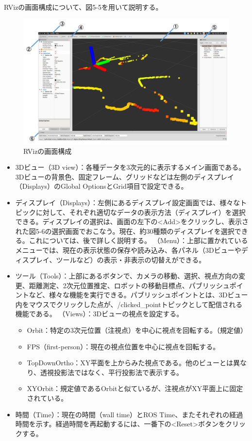 RVizの画面構成について、図5-5を用いて説明する。

\begin{figure}[h]
  \centering
  \includegraphics[width=\columnwidth]{pictures/chapter5/pic_05_05.png}
  \caption{RVizの画面構成}
\end{figure}

\begin{itemize}
\item 3Dビュー（3D view）：各種データを3次元的に表示するメイン画面である。3Dビューの背景色、固定フレーム、グリッドなどは左側のディスプレイ（Displays）のGlobal OptionsとGrid項目で設定できる。
\item ディスプレイ（Displays）：左側にあるディスプレイ設定画面では、様々なトピックに対して、それぞれ適切なデータの表示方法（ディスプレイ）を選択できる。ディスプレイの選択は、画面の左下の<Add>をクリックし、表示された図5-6の選択画面でおこなう。現在、約30種類のディスプレイを選択できる。これについては、後で詳しく説明する。
（Menu）：上部に置かれているメニューでは、現在の表示状態の保存や読み込み、各パネル（3Dビューやディスプレイ、ツールなど）の表示・非表示の切替えができる。
\item ツール（Tools）：上部にあるボタンで、カメラの移動、選択、視点方向の変更、距離測定、2次元位置推定、ロボットの移動目標点、パブリッシュポイントなど、様々な機能を実行できる。パブリッシュポイントとは、3Dビュー内をマウスでクリックした点が、/clicked\_pointトピックとして配信される機能である。
（Views）：3Dビューの視点を設定する。
  \begin{itemize}
  \item Orbit：特定の3次元位置（注視点）を中心に視点を回転する。（規定値）
  \item FPS（first-person）：現在の視点位置を中心に視点を回転する。
  \item TopDownOrtho：XY平面を上からみた視点である。他のビューとは異なり、透視投影法ではなく、平行投影法で表示する。
  \item  XYOrbit：規定値であるOrbitと似ているが、注視点がXY平面上に固定されている。
  \end{itemize}
\item 時間（Time）：現在の時間（wall time）とROS Time、またそれぞれの経過時間を示す。経過時間を再起動するには、一番下の<Reset>ボタンをクリックする。
\end{itemize}

